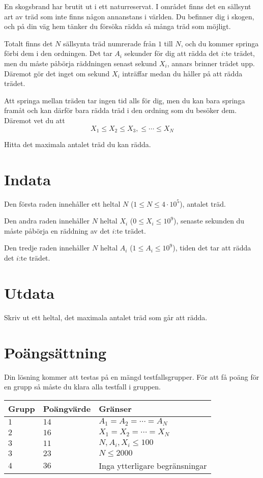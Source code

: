 
En skogsbrand har brutit ut i ett naturreservat. I området finns det en sällsynt art av träd
som inte finns någon annanstans i världen. Du befinner dig i skogen, och på din väg hem tänker du försöka rädda så många träd som möjligt.

Totalt finns det $N$ sällsynta träd numrerade från $1$ till $N$, och du kommer springa förbi dem i den ordningen. 
Det tar $A_i$ sekunder för dig att rädda det $i$:te trädet, men du måste påbörja räddningen
senast sekund $X_i$, annars brinner trädet upp. Däremot gör det inget om sekund $X_i$ inträffar medan
du håller på att rädda trädet.

Att springa mellan träden tar ingen tid alls för dig, men du kan bara springa framåt och kan därför
bara rädda träd i den ordning som du besöker dem. Däremot vet du att
$$X_1 \leq X_2 \leq X_3, \leq \cdots \leq X_N$$

Hitta det maximala antalet träd du kan rädda.

\section*{Indata}

Den första raden innehåller ett heltal $N$ ($1 \leq N \leq 4 \cdot 10^5$), antalet träd.

Den andra raden innehåller $N$ heltal $X_i$ ($0 \leq X_i \leq 10^9$), senaste sekunden du måste
påbörja en räddning av det $i$:te trädet.

Den tredje raden innehåller $N$ heltal $A_i$ ($1 \leq A_i \leq 10^9$), tiden det tar att rädda det 
$i$:te trädet.

\section*{Utdata}
Skriv ut ett heltal, det maximala antalet träd som går att rädda.

\section*{Poängsättning}
Din lösning kommer att testas på en mängd testfallsgrupper.
För att få poäng för en grupp så måste du klara alla testfall i gruppen.

\noindent
\begin{tabular}{| l | l | p{12cm} |}
  \hline
  Grupp & Poängvärde & Gränser \\ \hline
  $1$   & $14$       & $A_1 = A_2 = \cdots = A_N$\\ \hline
  $2$   & $16$       & $X_1 = X_2 = \cdots = X_N$  \\ \hline
  $3$   & $11$       & $N, A_i, X_i \leq 100$ \\ \hline
  $3$   & $23$       & $N \leq 2000$ \\ \hline
  $4$   & $36$       & Inga ytterligare begränsningar \\ \hline
\end{tabular}